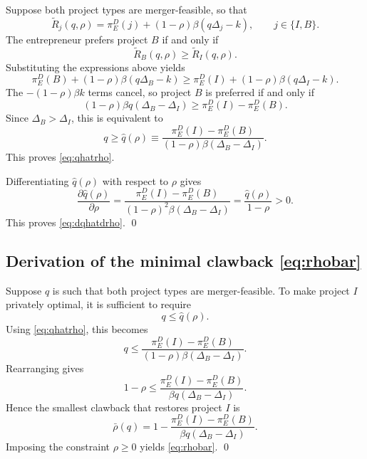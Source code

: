 Suppose both project types are merger-feasible, so that
\begin{equation}
    \widetilde R_j(q,\rho)
    =
    \pi_E^D(j)+(1-\rho)\beta(q\Delta_j-k),
    \qquad j\in\{I,B\}.
\end{equation}
The entrepreneur prefers project \(B\) if and only if
\begin{equation}
    \widetilde R_B(q,\rho)\ge \widetilde R_I(q,\rho).
\end{equation}
Substituting the expressions above yields
\begin{equation}
    \pi_E^D(B)+(1-\rho)\beta(q\Delta_B-k)
    \ge
    \pi_E^D(I)+(1-\rho)\beta(q\Delta_I-k).
\end{equation}
The \(-(1-\rho)\beta k\) terms cancel, so project \(B\) is preferred if and only if
\begin{equation}
    (1-\rho)\beta q(\Delta_B-\Delta_I)
    \ge
    \pi_E^D(I)-\pi_E^D(B).
\end{equation}
Since \(\Delta_B>\Delta_I\), this is equivalent to
\begin{equation}
    q\ge
    \hat q(\rho)
    \equiv
    \frac{
        \pi_E^D(I)-\pi_E^D(B)
    }{
        (1-\rho)\beta(\Delta_B-\Delta_I)
    }.
\end{equation}
This proves \eqref{eq:qhatrho}.

Differentiating \(\hat q(\rho)\) with respect to \(\rho\) gives
\begin{equation}
    \frac{\partial \hat q(\rho)}{\partial \rho}
    =
    \frac{
        \pi_E^D(I)-\pi_E^D(B)
    }{
        (1-\rho)^2\beta(\Delta_B-\Delta_I)
    }
    =
    \frac{\hat q(\rho)}{1-\rho}
    >0.
\end{equation}
This proves \eqref{eq:dqhatdrho}. \qed

\subsection{Derivation of the minimal clawback \eqref{eq:rhobar}}

Suppose \(q\) is such that both project types are merger-feasible.
To make project \(I\) privately optimal, it is sufficient to require
\begin{equation}
    q \le \hat q(\rho).
\end{equation}
Using \eqref{eq:qhatrho}, this becomes
\begin{equation}
    q
    \le
    \frac{
        \pi_E^D(I)-\pi_E^D(B)
    }{
        (1-\rho)\beta(\Delta_B-\Delta_I)
    }.
\end{equation}
Rearranging gives
\begin{equation}
    1-\rho
    \le
    \frac{
        \pi_E^D(I)-\pi_E^D(B)
    }{
        \beta q(\Delta_B-\Delta_I)
    }.
\end{equation}
Hence the smallest clawback that restores project \(I\) is
\begin{equation}
    \bar \rho(q)
    =
    1-
    \frac{
        \pi_E^D(I)-\pi_E^D(B)
    }{
        \beta q(\Delta_B-\Delta_I)
    }.
\end{equation}
Imposing the constraint \(\rho\ge 0\) yields \eqref{eq:rhobar}. \qed

